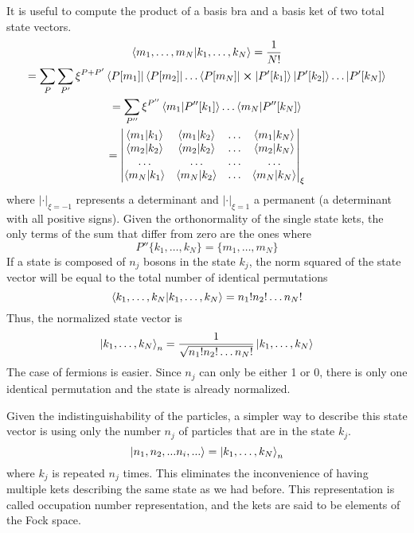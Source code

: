 It is useful to compute the product of a basis bra and a basis ket of two total state vectors.
\begin{multline} \label{eq:base_product}
    \bra{m_1, \dots, m_N} \ket{k_1, \dots, k_N} = \frac{1}{N!}
    \\ = \sum_P \sum_{P'} \xi^{P+P'} \bra{P[m_1]}\bra{P[m_2]}\dots\bra{P[m_N]} \cross \ket{P'[k_1]}\ket{P'[k_2]}\dots\ket{P'[k_N]}
    \\ = \sum_{P''} \xi^{P''} \braket{m_1}{P''[k_1]} \dots \braket{m_N}{P''[k_N]}
    \\ = \begin{vmatrix}
        \braket{m_1}{k_1} & \braket{m_1}{k_2} & \dots & \braket{m_1}{k_N} \\
        \braket{m_2}{k_2} & \braket{m_2}{k_2} & \dots & \braket{m_2}{k_N} \\
        \dots             & \dots             & \dots & \dots             \\
        \braket{m_N}{k_1} & \braket{m_N}{k_2} & \dots & \braket{m_N}{k_N}
    \end{vmatrix}_\xi
\end{multline}
where $|\cdot|_{\xi = -1}$ represents a determinant and $|\cdot|_{\xi = 1}$ a permanent (a determinant with all positive signs). Given the orthonormality of the single state kets, the only terms of the sum that differ from zero are the ones where
\begin{equation}
    P''\{k_1, \dots, k_N\} = \{m_1, \dots, m_N\}
\end{equation}
If a state is composed of $n_j$ bosons in the state $k_j$, the norm squared of the state vector will be equal to the total number of identical permutations
\begin{equation}
    \braket{k_1, \dots, k_N} = n_1!n_2!\dots n_N!
\end{equation}
Thus, the normalized state vector is
\begin{equation}
    \ket{k_1, \dots, k_N}_n= \frac{1}{\sqrt{n_1!n_2!\dots n_N!}} \ket{k_1, \dots, k_N}
\end{equation}
The case of fermions is easier. Since $n_j$ can only be either 1 or 0, there is only one identical permutation and the state is already normalized.

Given the indistinguishability of the particles, a simpler way to describe this state vector is using only the number $n_j$ of particles that are in the state $k_j$.
\begin{equation} \label{eq:occupation_definition}
    \ket{n_1, n_2, ... n_i, ...} = \ket{k_1, \dots, k_N}_n
\end{equation}
where $k_j$ is repeated $n_j$ times. This eliminates the inconvenience of having multiple kets describing the same state as we had before. This representation is called occupation number representation, and the kets are said to be elements of the Fock space.

